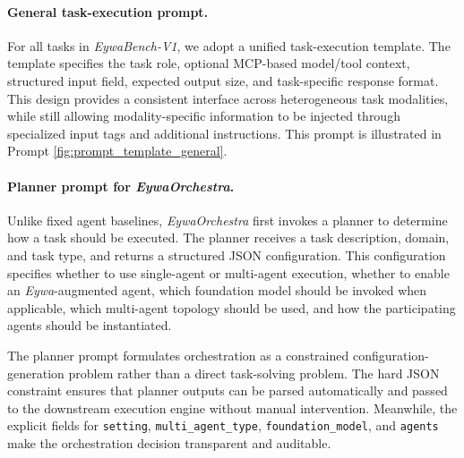 \paragraph{General task-execution prompt.}
For all tasks in \textit{EywaBench-V1}, we adopt a unified task-execution template. The template specifies the task role, optional MCP-based model/tool context, structured input field, expected output size, and task-specific response format. This design provides a consistent interface across heterogeneous task modalities, while still allowing modality-specific information to be injected through specialized input tags and additional instructions. This prompt is illustrated in Prompt \ref{fig:prompt_template_general}.

\paragraph{Planner prompt for \textit{EywaOrchestra}.}
Unlike fixed agent baselines, \textit{EywaOrchestra} first invokes a planner to determine how a task should be executed. The planner receives a task description, domain, and task type, and returns a structured JSON configuration. This configuration specifies whether to use single-agent or multi-agent execution, whether to enable an \textit{Eywa}-augmented agent, which foundation model should be invoked when applicable, which multi-agent topology should be used, and how the participating agents should be instantiated.

The planner prompt formulates orchestration as a constrained configuration-generation problem rather than a direct task-solving problem. The hard JSON constraint ensures that planner outputs can be parsed automatically and passed to the downstream execution engine without manual intervention. Meanwhile, the explicit fields for \texttt{setting}, \texttt{multi\_agent\_type}, \texttt{foundation\_model}, and \texttt{agents} make the orchestration decision transparent and auditable.



